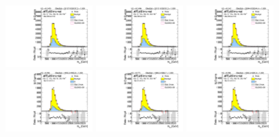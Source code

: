 \begin{figure}[htbp!]
\begin{center}
\includegraphics[angle=270, width=0.3\textwidth]{./figures/boosted/AppendixResveto/Moriond_TwoTag_split_Sideband_mHH_l.pdf}
\includegraphics[angle=270, width=0.3\textwidth]{./figures/boosted/AppendixResveto/Moriond_resveto_TwoTag_split_Sideband_mHH_l.pdf}
\includegraphics[angle=270, width=0.3\textwidth]{./figures/boosted/AppendixResveto/Moriond_fullresveto_TwoTag_split_Sideband_mHH_l.pdf}\\
\includegraphics[angle=270, width=0.3\textwidth]{./figures/boosted/AppendixResveto/Moriond_ThreeTag_Sideband_mHH_l.pdf}
\includegraphics[angle=270, width=0.3\textwidth]{./figures/boosted/AppendixResveto/Moriond_resveto_ThreeTag_Sideband_mHH_l.pdf}
\includegraphics[angle=270, width=0.3\textwidth]{./figures/boosted/AppendixResveto/Moriond_fullresveto_ThreeTag_Sideband_mHH_l.pdf}\\

\end{center}
\end{figure}
